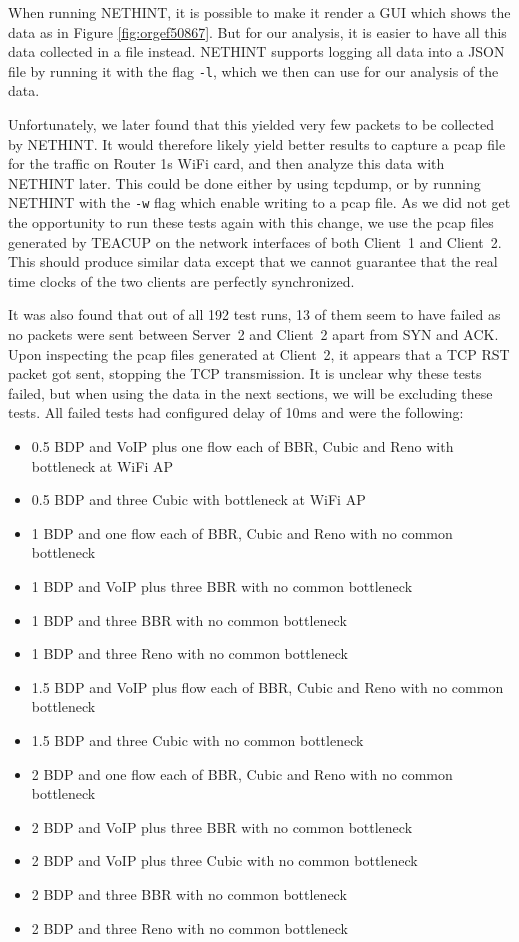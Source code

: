 \documentclass[a4paper,11pt]{article}
\begin{document}
When running NETHINT, it is possible to make it render a GUI which shows the data as in Figure \ref{fig:orgef50867}. But for our analysis, it is easier to have all this data collected in a file instead. NETHINT supports logging all data into a JSON file by running it with the flag \texttt{-l}, which we then can use for our analysis of the data.

Unfortunately, we later found that this yielded very few packets to be collected by NETHINT. It would therefore likely yield better results to capture a pcap file for the traffic on Router 1s WiFi card, and then analyze this data with NETHINT later. This could be done either by using tcpdump, or by running NETHINT with the \texttt{-w} flag which enable writing to a pcap file. As we did not get the opportunity to run these tests again with this change, we use the pcap files generated by TEACUP on the network interfaces of both Client~1 and Client~2. This should produce similar data except that we cannot guarantee that the real time clocks of the two clients are perfectly synchronized.

It was also found that out of all 192 test runs, 13 of them seem to have failed as no packets were sent between Server~2 and Client~2 apart from SYN and ACK. Upon inspecting the pcap files generated at Client~2, it appears that a TCP RST packet got sent, stopping the TCP transmission. It is unclear why these tests failed, but when using the data in the next sections, we will be excluding these tests. All failed tests had configured delay of 10ms and were the following:

\begin{itemize}
\item 0.5 BDP and VoIP plus one flow each of BBR, Cubic and Reno with bottleneck at WiFi AP
\item 0.5 BDP and three Cubic with bottleneck at WiFi AP
\item 1 BDP and one flow each of BBR, Cubic and Reno with no common bottleneck
\item 1 BDP and VoIP plus three BBR with no common bottleneck
\item 1 BDP and three BBR with no common bottleneck
\item 1 BDP and three Reno with no common bottleneck
\item 1.5 BDP and VoIP plus flow each of BBR, Cubic and Reno with no common bottleneck
\item 1.5 BDP and three Cubic with no common bottleneck
\item 2 BDP and one flow each of BBR, Cubic and Reno with no common bottleneck
\item 2 BDP and VoIP plus three BBR with no common bottleneck
\item 2 BDP and VoIP plus three Cubic with no common bottleneck
\item 2 BDP and three BBR with no common bottleneck
\item 2 BDP and three Reno with no common bottleneck
\end{itemize}
\end{document}
